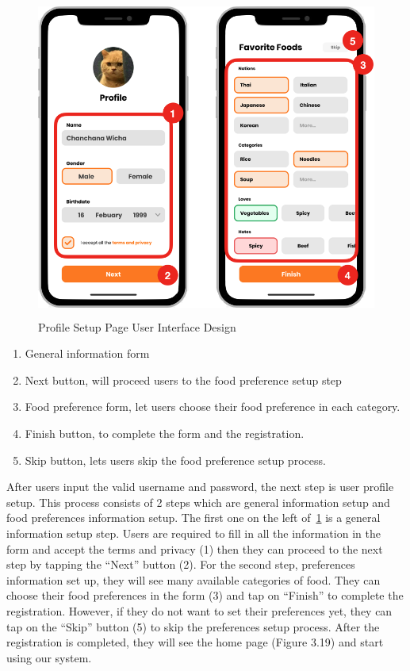\documentclass[12pt,oneside,openright,a4paper]{cpe-english-project}
\begin{document}
\newpage
\begin{figure}[!h]\centering
\includegraphics[height=300pt]{./images/3ui_ProfileSetupPageUserInterfaceDesign.png}
\caption{Profile Setup Page User Interface Design}\label{fig:3ui_ProfileSetupPageUserInterfaceDesign}
\end{figure}
\begin{enumerate}
\item General information form
\item Next button, will proceed users to the food preference setup step
\item Food preference form, let users choose their food preference in each category.
\item Finish button, to complete the form and the registration.
\item Skip button, lets users skip the food preference setup process.
\end{enumerate}
After users input the valid username and password, the next step is user profile setup. This process consists of 2 steps which are general information setup and food preferences information setup. The first one on the left of~\ref{fig:3ui_ProfileSetupPageUserInterfaceDesign} is a general information setup step. Users are required to fill in all the information in the form and accept the terms and privacy (1) then they can proceed to the next step by tapping the “Next” button (2). For the second step, preferences information set up, they will see many available categories of food. They can choose their food preferences in the form (3) and tap on “Finish” to complete the registration. However, if they do not want to set their preferences yet, they can tap on the “Skip” button (5) to skip the preferences setup process. After the registration is completed, they will see the home page (Figure 3.19) and start using our system.
\newpage
\end{document}
